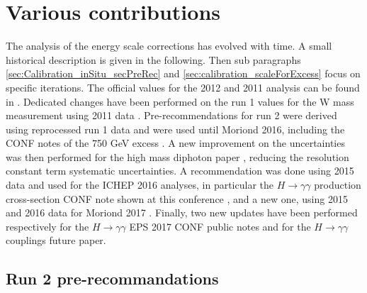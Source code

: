 \section{Various contributions}
\label{sec:orgcefe868}

The analysis of the energy scale corrections has evolved with time.
A small historical description is given in the following.
Then sub paragraphs \ref{sec:Calibration_inSitu_secPreRec} and \ref{sec:calibration_scaleForExcess} focus on specific iterations.
The official values for the 2012 and 2011 analysis can be found in \cite{CERN-PH-EP-2014-153,ATL-COM-PHYS-2013-1653}.
Dedicated changes have been performed on the run 1 values for the W mass measurement \cite{CERN-EP-2016-305} using 2011 data \cite{ATL-COM-PHYS-2014-1434}.
Pre-recommendations for run 2 were derived \cite{ATL-PHYS-PUB-2016-015,ATL-COM-PHYS-2015-1300} using reprocessed run 1 data and were used until Moriond 2016, including the CONF notes of the 750 GeV excess \cite{ATLAS-CONF-2016-018,ATLAS-CONF-2015-081}.
A new improvement on the uncertainties was then performed \cite{ATL-COM-PHYS-2016-184,ATL-COM-PHYS-2016-437} for the high mass diphoton paper \cite{CERN-EP-2016-120}, reducing the resolution constant term systematic uncertainties.
A recommendation was done using 2015 data \cite{ATL-PHYS-PUB-2016-015} and used for the ICHEP 2016 analyses, in particular the \(H\rightarrow\gamma\gamma\) production cross-section CONF note shown at this conference \cite{ATLAS-COM-CONF-2016-068},  and a new one, using 2015 and 2016 data for Moriond 2017 \cite{MoriondCalib}.
Finally, two new updates \cite{ATL-COM-PHYS-2017-757,EPSCalib} have been performed respectively for the \(H\rightarrow\gamma\gamma\) EPS 2017 CONF \cite{ATLAS-CONF-2017-045,ATLAS-COM-CONF-2017-054,ATLAS-CONF-2017-046} public notes and for the $H\rightarrow\gamma\gamma$ couplings future paper.


\subsection{Run 2 pre-recommandations}
\label{sec:org6c03620}

